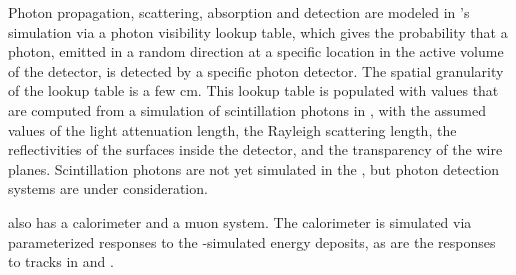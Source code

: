 Photon propagation, scattering, absorption and detection are modeled in 's simulation via a photon visibility lookup table, which gives the probability that a photon, emitted in a random direction at a specific location in the active volume of the detector, is detected by a specific photon detector.  The spatial granularity of the lookup table is a few cm.  This lookup table is populated with values that are computed from a  simulation of scintillation photons in , with the assumed values of the light attenuation length, the Rayleigh scattering length, the reflectivities of the surfaces inside the detector, and the transparency of the wire planes.  Scintillation photons are not yet simulated in the , but photon detection systems are under consideration. 

 also has a calorimeter and a muon system.  The calorimeter is simulated via parameterized responses to the -simulated energy deposits, as are the responses to tracks in  and .